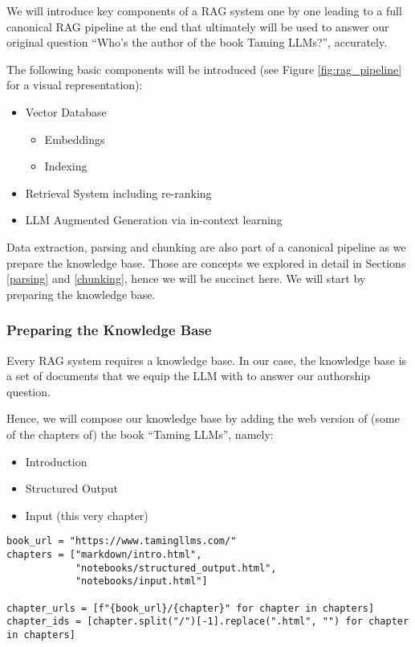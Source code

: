 We will introduce key components of a RAG system one by one leading to a full canonical RAG pipeline at the end that ultimately will be used to answer our original question ``Who's the author of the book Taming LLMs?'', accurately.

The following basic components will be introduced (see Figure \ref{fig:rag_pipeline} for a visual representation):
\begin{itemize}
    \item Vector Database
    \begin{itemize}
        \item Embeddings
        \item Indexing
    \end{itemize}
    \item Retrieval System including re-ranking
    \item LLM Augmented Generation via in-context learning
\end{itemize}

Data extraction, parsing and chunking are also part of a canonical pipeline as we prepare the knowledge base. Those are concepts we explored in detail in Sections \ref{parsing} and \ref{chunking}, hence we will be succinct here. We will start by preparing the knowledge base.

%

\subsubsection{Preparing the Knowledge Base}

Every RAG system requires a knowledge base. In our case, the knowledge base is a set of documents that we equip the LLM with to answer our authorship question.

Hence, we will compose our knowledge base by adding the web version of (some of the chapters of) the book ``Taming LLMs'', namely:
\begin{itemize}
    \item Introduction
    \item Structured Output
    \item Input (this very chapter)
\end{itemize}

\begin{verbatim}
book_url = "https://www.tamingllms.com/"
chapters = ["markdown/intro.html",
            "notebooks/structured_output.html",
            "notebooks/input.html"]

chapter_urls = [f"{book_url}/{chapter}" for chapter in chapters]
chapter_ids = [chapter.split("/")[-1].replace(".html", "") for chapter in chapters]
\end{verbatim}

